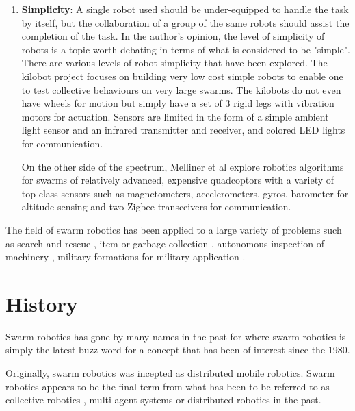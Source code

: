 \begin{enumerate}
\item \textbf{Simplicity}: A single robot used should be under-equipped to handle the task by itself, but the collaboration of a group of the same robots should assist the completion of the task. In the author's opinion, the level of simplicity of robots is a topic worth debating in terms of what is considered to be "simple". There are various levels of robot simplicity that have been explored. The kilobot project \cite{rubenstein2012kilobot} focuses on building very low cost simple robots to enable one to test collective behaviours on very large swarms. The kilobots do not even have wheels for motion but simply have a set of 3 rigid legs with vibration motors for actuation. Sensors are limited in the form of a simple ambient light sensor and an infrared transmitter and receiver, and colored LED lights for communication. 

On the other side of the spectrum, Melliner et al \cite{mellinger2013cooperative,kushleyev2013towards} explore robotics algorithms for swarms of relatively advanced, expensive quadcoptors with a variety of top-class sensors such as magnetometers, accelerometers, gyros, barometer for altitude sensing and two Zigbee transceivers for communication.
\end{enumerate}

 The field of swarm robotics has been applied to a large variety of problems such as search and rescue \cite{mondada2002search}, item or garbage collection \cite{balch1995io}, autonomous inspection of machinery \cite{correll2007challenging}, military formations for military application \cite{balch1998behavior}.



\section{History}
\label{history}

Swarm robotics has gone by many names in the past for where swarm robotics is simply the latest buzz-word for a concept that has been of interest since the 1980.

Originally, swarm robotics was incepted as distributed mobile robotics. 
Swarm robotics appears to be the final term from what has been to be referred to as collective robotics \cite{kube1993collective}, multi-agent systems \cite{jennings1993commitments} or distributed robotics \cite{gauthier1987interprocess} in the past. 

